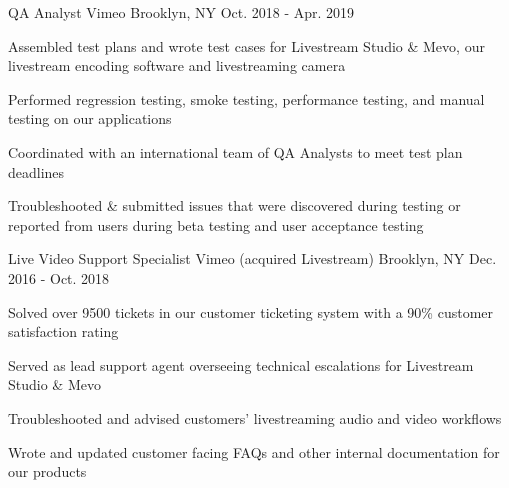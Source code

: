 \vspace{-1.0mm}

\begin{cventries}

  \cventry
    {QA Analyst} %
    {Vimeo\vspace{-2.0mm}} %
    {Brooklyn, NY\vspace{-2.0mm}} %
    {Oct. 2018 - Apr. 2019} %
    {
      \begin{cvitems} %
        \item {Assembled test plans and wrote test cases for Livestream Studio \& Mevo, our livestream encoding software and livestreaming camera}
        \item {Performed regression testing, smoke testing, performance testing, and manual testing on our applications}
        \item {Coordinated with an international team of QA Analysts to meet test plan deadlines}
        \item {Troubleshooted \& submitted issues that were discovered during testing or reported from users during beta testing and user acceptance testing}
      \end{cvitems}
    }

  \cventry
    {Live Video Support Specialist} %
    {Vimeo (acquired Livestream)\vspace{-2.0mm}} %
    {Brooklyn, NY\vspace{-2.0mm}} %
    {Dec. 2016 - Oct. 2018} %
    {
      \begin{cvitems} %
        \item {Solved over 9500 tickets in our customer ticketing system with a 90\% customer satisfaction rating}
        \item {Served as lead support agent overseeing technical escalations for Livestream Studio \& Mevo}
        \item {Troubleshooted and advised customers' livestreaming audio and video workflows}
        \item {Wrote and updated customer facing FAQs and other internal documentation for our products}      
      \end{cvitems}
    }

\end{cventries}

